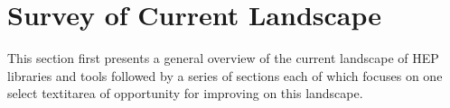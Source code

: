 \section{Survey of Current Landscape}

This section first presents a general overview of the current landscape of HEP libraries and tools followed by a series of sections each of which focuses on one select textit{area of opportunity} for improving on this landscape. 











